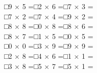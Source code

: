\documentclass[uplatex,
paper=a4,
fontsize=18pt,
jafontsize=16pt,
number_of_lines=30,
line_length=30zh,
baselineskip=25pt,
]{jlreq}
\begin{document}
□\hspace{1em}9 × 5 =\hspace{3em}□\hspace{1em}2 × 6 =\hspace{3em}□\hspace{1em}7 × 3 =\hspace{3em}
\\

□\hspace{1em}7 × 2 =\hspace{3em}□\hspace{1em}7 × 4 =\hspace{3em}□\hspace{1em}9 × 2 =\hspace{3em}
\\

□\hspace{1em}8 × 8 =\hspace{3em}□\hspace{1em}0 × 8 =\hspace{3em}□\hspace{1em}8 × 6 =\hspace{3em}
\\

□\hspace{1em}8 × 7 =\hspace{3em}□\hspace{1em}1 × 5 =\hspace{3em}□\hspace{1em}0 × 5 =\hspace{3em}
\\

□\hspace{1em}0 × 0 =\hspace{3em}□\hspace{1em}3 × 9 =\hspace{3em}□\hspace{1em}9 × 9 =\hspace{3em}
\\

□\hspace{1em}2 × 8 =\hspace{3em}□\hspace{1em}4 × 6 =\hspace{3em}□\hspace{1em}1 × 1 =\hspace{3em}
\\

□\hspace{1em}3 × 8 =\hspace{3em}□\hspace{1em}5 × 7 =\hspace{3em}□\hspace{1em}5 × 1 =\hspace{3em}
\\
\end{document}
